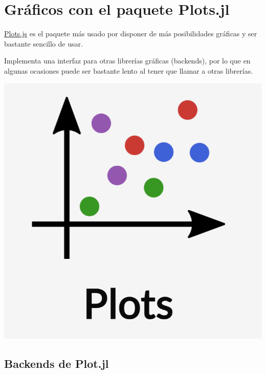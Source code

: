 \documentclass[
  letterpaper,
  DIV=11,
  numbers=noendperiod]{scrreprt}
\begin{document}
\hypertarget{gruxe1ficos-con-el-paquete-plots.jl}{%
\section{Gráficos con el paquete
Plots.jl}\label{gruxe1ficos-con-el-paquete-plots.jl}}

\href{https://docs.juliaplots.org/}{Plots.js} es el paquete más usado
por disponer de más posibilidades gráficas y ser bastante sencillo de
usar.

Implementa una interfaz para otras librerías gráficas (backends), por lo
que en algunas ocasiones puede ser bastante lento al tener que llamar a
otras librerías.

\includegraphics{./img/logos/plotsjl.png}

\hypertarget{backends-de-plot.jl}{%
\subsection{Backends de Plot.jl}\label{backends-de-plot.jl}}
\end{document}
